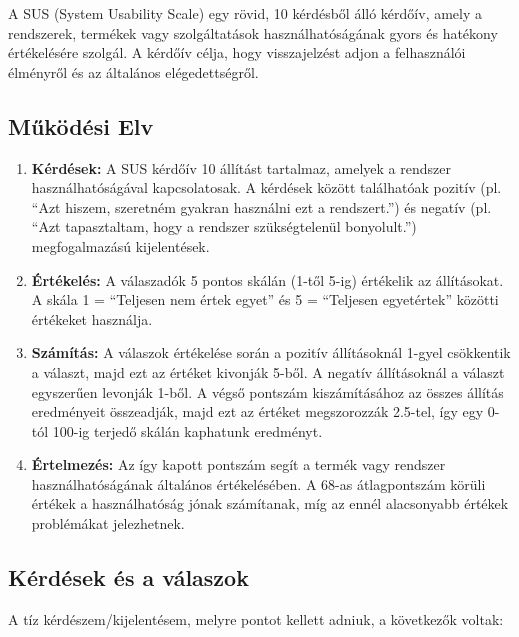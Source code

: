 A SUS (System Usability Scale) egy rövid, 10 kérdésből álló kérdőív, amely a rendszerek, termékek vagy szolgáltatások használhatóságának gyors és hatékony értékelésére szolgál. A kérdőív célja, hogy visszajelzést adjon a felhasználói élményről és az általános elégedettségről.

\subsection{Működési Elv}
\begin{enumerate}
    \item \textbf{Kérdések:} A SUS kérdőív 10 állítást tartalmaz, amelyek a rendszer használhatóságával kapcsolatosak. A kérdések között találhatóak pozitív (pl. ``Azt hiszem, szeretném gyakran használni ezt a rendszert.'') és negatív (pl. ``Azt tapasztaltam, hogy a rendszer szükségtelenül bonyolult.'') megfogalmazású kijelentések.
    
    \item \textbf{Értékelés:} A válaszadók 5 pontos skálán (1-től 5-ig) értékelik az állításokat. A skála 1 = ``Teljesen nem értek egyet'' és 5 = ``Teljesen egyetértek'' közötti értékeket használja.
    
    \item \textbf{Számítás:} A válaszok értékelése során a pozitív állításoknál 1-gyel csökkentik a választ, majd ezt az értéket kivonják 5-ből. A negatív állításoknál a választ egyszerűen levonják 1-ből. A végső pontszám kiszámításához az összes állítás eredményeit összeadják, majd ezt az értéket megszorozzák 2.5-tel, így egy 0-tól 100-ig terjedő skálán kaphatunk eredményt.
    
    \item \textbf{Értelmezés:} Az így kapott pontszám segít a termék vagy rendszer használhatóságának általános értékelésében. A 68-as átlagpontszám körüli értékek a használhatóság jónak számítanak, míg az ennél alacsonyabb értékek problémákat jelezhetnek.
\end{enumerate}

\subsection{Kérdések és a válaszok}
A tíz kérdészem/kijelentésem, melyre pontot kellett adniuk, a következők voltak:

